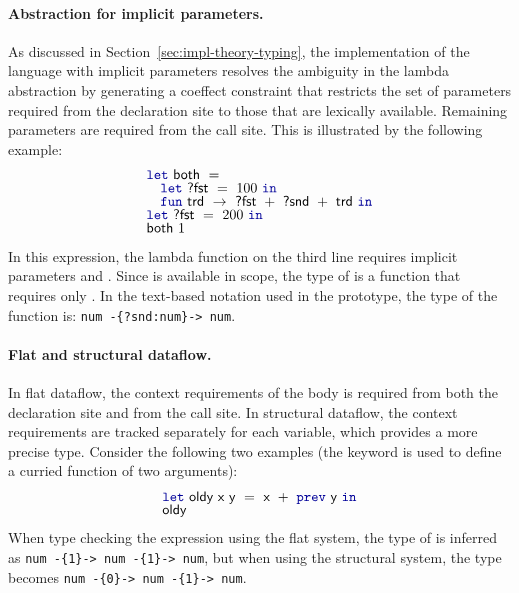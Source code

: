\paragraph{Abstraction for implicit parameters.}
As discussed in Section~\ref{sec:impl-theory-typing}, the implementation of the language with
implicit parameters resolves the ambiguity in the lambda abstraction by generating a coeffect
constraint that restricts the set of parameters required from the declaration site to those that
are lexically available. Remaining parameters are required from the call site. This is illustrated
by the following example:
%
\begin{equation*}
\begin{array}{l}
\kvd{let}~\ident{both}~=\\[-0.25em]
\quad \kvd{let}~\ident{?fst}~=~100~\kvd{in}\\[-0.25em]
\quad \kvd{fun}~\ident{trd}~\rightarrow~\ident{?fst}~+~\ident{?snd}~+~\ident{trd}~\kvd{in}\\[-0.25em]
\kvd{let}~\ident{?fst}~=~200~\kvd{in}\\[-0.25em]
\ident{both}~1
\end{array}
\end{equation*}
%
In this expression, the lambda function on the third line requires implicit parameters  and
. Since  is available in scope, the type of  is a function that
requires only . In the text-based notation used in the prototype, the type of the
function  is: {\tt num -\{?snd:num\}-> num}.

\vspace{-0.5em}
\paragraph{Flat and structural dataflow.}
In flat dataflow, the context requirements of the body is required from both the declaration site
and from the call site. In structural dataflow, the context requirements are tracked separately
for each variable, which provides a more precise type. Consider the following two examples (the
 keyword is used to define a curried function of two arguments):
%
\begin{equation*}
\begin{array}{l}
\kvd{let}~\ident{oldy}~\ident{x}~\ident{y}~=~\ident{x}~+~\kvd{prev}~\ident{y}~\kvd{in}\\[-0.25em]
\ident{oldy}
\end{array}
\end{equation*}
%
When type checking the expression using the flat system, the type of  is inferred as {\tt num -\{1\}-> num -\{1\}-> num},
but when using the structural system, the type becomes {\tt num -\{0\}-> num -\{1\}-> num}.

